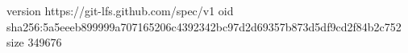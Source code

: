 version https://git-lfs.github.com/spec/v1
oid sha256:5a5eeeb899999a707165206c4392342bc97d2d69357b873d5df9cd2f84b2c752
size 349676
